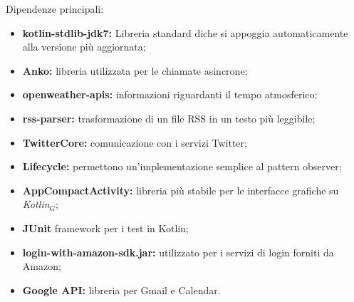 Dipendenze principali:
\begin{itemize}
	\item \textbf {kotlin-stdlib-jdk7:} Libreria standard diche si appoggia automaticamente alla versione più aggiornata;
	\item \textbf {Anko:} libreria utilizzata per le chiamate asincrone;
	\item \textbf{openweather-apis:} informazioni riguardanti il tempo atmosferico;
	\item \textbf{rss-parser:} trasformazione di un file RSS in un testo più leggibile;
	\item \textbf{TwitterCore:} comunicazione con i servizi Twitter;
	\item \textbf{Lifecycle:} permettono un'implementazione semplice al pattern observer;
	\item \textbf{AppCompactActivity:} libreria più stabile per le interfacce grafiche su \textit{Kotlin$_{G}$};
	\item \textbf{JUnit} framework per i test in Kotlin;
	\item \textbf{login-with-amazon-sdk.jar:} utilizzato per i servizi di login forniti da Amazon;
	\item \textbf{Google API:} libreria per Gmail e Calendar.
\end{itemize}
